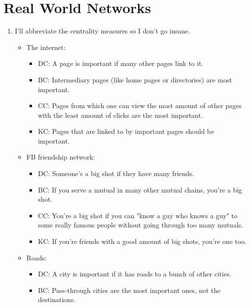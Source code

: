 \documentclass[12pt]{article}
\begin{document}
\section{Real World Networks}

\begin{enumerate}
      \item I'll abbreviate the centrality measures so I don't go insane.
            \begin{itemize}
                  \item The internet:
                        \begin{itemize}
                              \item DC: A page is important if many other pages link to it.
                              \item BC: Intermediary pages (like home pages or directories) are most important.
                              \item CC: Pages from which one can view the most amount of
                                    other pages with the least amount of clicks are the most important.
                              \item KC: Pages that are linked to by important pages should be important.
                        \end{itemize}
                  \item FB friendship network:
                        \begin{itemize}
                              \item DC: Someone's a big shot if they have many friends.
                              \item BC: If you serve a mutual in many other mutual chains, you're a big shot.
                              \item CC: You're a big shot if you can "know a guy who knows a guy"
                                    to some really famous people without going through too many mutuals.
                              \item KC: If you're friends with a good amount of big shots, you're one too.
                        \end{itemize}
                  \item Roads:
                        \begin{itemize}
                              \item DC: A city is important if it has roads to a bunch of other cities.
                              \item BC: Pass-through cities are the most important ones, not the destinations.

\end{itemize}
\end{itemize}
\end{enumerate}
\end{document}
